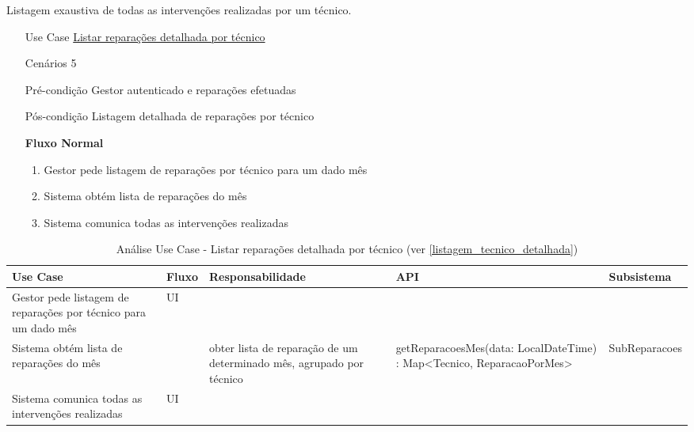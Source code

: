 \documentclass[../relatorio.tex]{subfiles}
\begin{document}
Listagem exaustiva de todas as intervenções realizadas por um técnico.
\begin{itemize}
    \item[Use Case] {\underline{Listar reparações detalhada por técnico}}
    \item[Cenários] {5}
    \item[Pré-condição] {Gestor autenticado e reparações efetuadas}
    \item[Pós-condição] {Listagem detalhada de reparações por técnico}
          \begin{flushleft}
              \textbf{Fluxo Normal}
          \end{flushleft}
          \begin{enumerate}
              \item Gestor pede listagem de reparações por técnico para um dado mês %
              \item Sistema obtém lista de reparações do mês %
              \item Sistema comunica todas as intervenções realizadas %
          \end{enumerate}
\end{itemize}
\begin{landscape}
    \begin{table}[!h]
        \centering
        \begin{tabular}{|p{5cm}|p{1cm}|p{4cm}|p{6cm}|p{4cm}|}
            \hline
            \rowcolor{gray!20!white}
            Use Case & Fluxo & Responsabilidade & API & Subsistema \\
            \hline
            \rowcolor{yellow}
            Gestor pede listagem de reparações por técnico para um dado mês
                     & 
            UI
                     & 
                     & 
                     & 
            \\
            \hline
            Sistema obtém lista de reparações do mês
                     & 
                     & 
            obter lista de reparação de um determinado mês, agrupado por técnico
                     & 
            getReparacoesMes(data: LocalDateTime) : Map<Tecnico, ReparacaoPorMes>
                     & 
            SubReparacoes
            \\
            \hline
            \rowcolor{yellow}
            Sistema comunica todas as intervenções realizadas
                     & 
            UI
                     & 
                     & 
                     & 
            \\
            \hline
        \end{tabular}
        \caption{Análise Use Case - Listar reparações detalhada por técnico (ver \ref{listagem_tecnico_detalhada})}
    \end{table}
\end{landscape}
\end{document}
